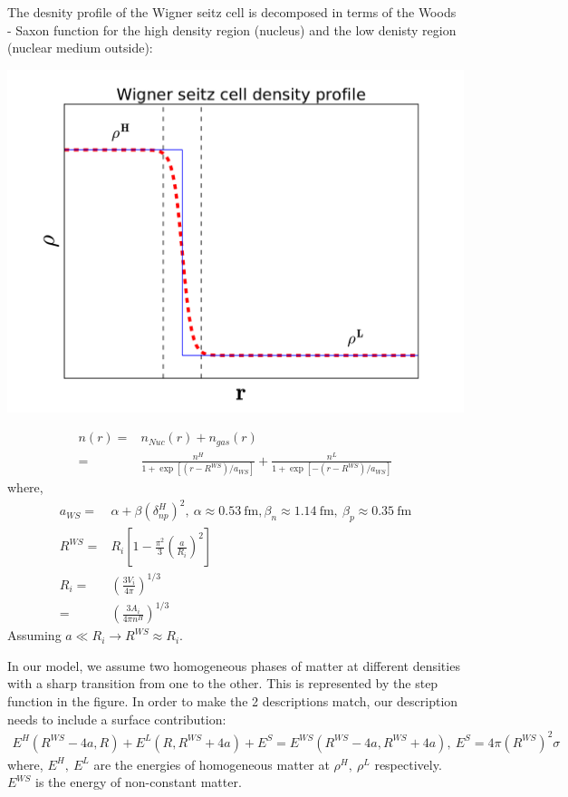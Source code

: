 \documentclass[11pt,letter]{article}
\begin{document}
The desnity profile of the Wigner seitz cell is decomposed in terms of the Woods - Saxon function for the high density region (nucleus) and the low denisty 
region (nuclear medium outside):
\begin{center}
 \includegraphics[scale=0.6]{WSCprofile.pdf}
\end{center}
\begin{equation}
 \begin{split}
  n(r) = & n_{Nuc}(r)+n_{gas}(r) \\
  =&\frac{n^{H}}{1+\exp[(r-R^{WS})/a_{WS}]} + \frac{n^{L}}{1+\exp[-(r-R^{WS})/a_{WS}]} 
 \end{split}
\end{equation}
where,
\begin{equation}
 \begin{split}
  a_{WS} =& \alpha + \beta (\delta^{H}_{np})^2,\ \alpha \approx 0.53\ \text{fm}, \beta_n \approx 1.14\ \text{fm},\ \beta_p \approx 0.35\ \text{fm} \\
  R^{WS} =& R_{i}[1-\frac{\pi^2}{3}(\frac{a}{R_i})^2]\\
  R_i =& (\frac{3 V_i}{4\pi})^{1/3}\\
  =& (\frac{3 A_i}{4\pi n^H})^{1/3}
 \end{split}
\end{equation}
Assuming $a \ll R_i \rightarrow R^{WS}\approx R_i$. 

In our model, we assume two homogeneous phases of matter at different densities with a sharp transition from one to the other.
This is represented by the step function in the figure.
In order to make the 2 descriptions match, our description needs to include a surface contribution:
\begin{equation}
 \begin{split}
  E^H(R^{WS}-4a,R)+E^L(R,R^{WS}+4a)+E^{S}=E^{WS}(R^{WS}-4a,R^{WS}+4a),\ E^{S} = 4\pi (R^{WS})^2 \sigma
 \end{split}
\end{equation}
where, $E^H,\ E^L$ are the energies of homogeneous matter at $\rho^H,\ \rho^L$ respectively. $E^{WS}$ is the 
energy of non-constant matter.
\end{document}
